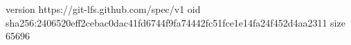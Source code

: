 version https://git-lfs.github.com/spec/v1
oid sha256:2406520eff2cebac0dac41fd6744f9fa74442fc51fce1e14fa24f452d4aa2311
size 65696
